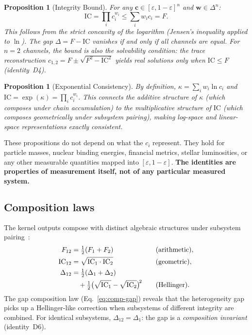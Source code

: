 \documentclass[
  aps,
  prd,
  twocolumn,
  superscriptaddress,
  nofootinbib,
  floatfix
]{revtex4-2}
\newtheorem{proposition}[theorem]{Proposition}
\newcommand{\eps}{\varepsilon}
\newcommand{\beq}{\begin{equation}}
\newcommand{\eeq}{\end{equation}}
\newcommand{\tvec}{\mathbf{c}}
\newcommand{\wvec}{\mathbf{w}}
\newcommand{\IC}{\mathrm{IC}}
\begin{document}
\begin{proposition}[Integrity Bound]\label{prop:icbound}
For any $\tvec \in [\eps, 1{-}\eps]^n$ and $\wvec \in \Delta^n$:
\beq\label{eq:ic-bound-proof}
  \IC = \textstyle\prod_i c_i^{w_i} \leq \sum_i w_i c_i = F.
\eeq
This follows from the strict concavity of the logarithm (Jensen's
inequality applied to $\ln$).  The gap $\Delta = F - \IC$ vanishes
if and only if all channels are equal.  For $n = 2$ channels, the
bound is also the \emph{solvability condition}: the trace
reconstruction $c_{1,2} = F \pm \sqrt{F^2 - \IC^2}$ yields real
solutions only when $\IC \leq F$ (identity~D4).
\end{proposition}

\begin{proposition}[Exponential Consistency]\label{prop:expmap}
By definition, $\kappa = \sum_i w_i \ln c_i$ and
$\IC = \exp(\kappa) = \prod_i c_i^{w_i}$.  This connects the additive
structure of $\kappa$ (which composes under chain accumulation) to the
multiplicative structure of $\IC$ (which composes geometrically under
subsystem pairing), making log-space and linear-space representations
exactly consistent.
\end{proposition}

These propositions do not depend on what the $c_i$ represent.  They
hold for particle masses, nuclear binding energies, financial metrics,
stellar luminosities, or any other measurable quantities mapped into
$[\eps, 1{-}\eps]$.  \textbf{The identities are properties of
measurement itself, not of any particular measured system.}

\subsection{Composition laws}

The kernel outputs compose with distinct algebraic structures under
subsystem pairing~\cite{paulus2025physicscoherence}:
\begin{alignat}{2}
  F_{12} &= \tfrac{1}{2}(F_1 + F_2)
    &\quad& \text{(arithmetic)}, \label{eq:comp-F}\\
  \IC_{12} &= \sqrt{\IC_1 \cdot \IC_2}
    && \text{(geometric)}, \label{eq:comp-IC}\\
  \Delta_{12} &= \tfrac{1}{2}(\Delta_1 + \Delta_2) \notag\\
    &\quad + \tfrac{1}{2}\bigl(\sqrt{\IC_1} - \sqrt{\IC_2}\bigr)^{\!2}
    && \text{(Hellinger)}. \label{eq:comp-gap}
\end{alignat}
The gap composition law (Eq.~\ref{eq:comp-gap}) reveals that the
heterogeneity gap picks up a Hellinger-like correction when subsystems
of different integrity are combined.  For identical subsystems,
$\Delta_{12} = \Delta_1$: the gap is a \emph{composition invariant}
(identity~D6).
\end{document}
